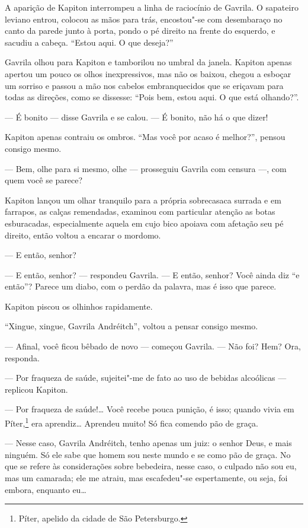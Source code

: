 A aparição de Kapiton interrompeu a linha de raciocínio de Gavrila. O
sapateiro leviano entrou, colocou as mãos para trás, encostou"-se com
desembaraço no canto da parede junto à porta, pondo o pé direito na
frente do esquerdo, e sacudiu a cabeça. ``Estou aqui. O que deseja?''

Gavrila olhou para Kapiton e tamborilou no umbral da janela. Kapiton
apenas apertou um pouco os olhos inexpressivos, mas não os baixou,
chegou a esboçar um sorriso e passou a mão nos cabelos embranquecidos
que se eriçavam para todas as direções, como se dissesse: ``Pois bem,
estou aqui. O que está olhando?''.

--- É bonito --- disse Gavrila e se calou. --- É bonito, não há o que
dizer!

Kapiton apenas contraiu os ombros. ``Mas você por acaso é melhor?'',
pensou consigo mesmo.

--- Bem, olhe para si mesmo, olhe --- prosseguiu Gavrila com censura
---, com quem você se parece?

Kapiton lançou um olhar tranquilo para a própria sobrecasaca surrada e
em farrapos, as calças remendadas, examinou com particular atenção as
botas esburacadas, especialmente aquela em cujo bico apoiava com
afetação seu pé direito, então voltou a encarar o mordomo.

--- E então, senhor?

--- E então, senhor? --- respondeu Gavrila. --- E então, senhor? Você
ainda diz ``e então''? Parece um diabo, com o perdão da palavra, mas é
isso que parece.

Kapiton piscou os olhinhos rapidamente.

``Xingue, xingue, Gavrila Andréitch'', voltou a pensar consigo mesmo.

--- Afinal, você ficou bêbado de novo --- começou Gavrila. --- Não foi?
Hem? Ora, responda.

--- Por fraqueza de saúde, sujeitei"-me de fato ao uso de bebidas
alcoólicas --- replicou Kapiton.

--- Por fraqueza de saúde!\ldots{} Você recebe pouca punição, é isso; quando
vivia em Píter,\footnote{Píter, apelido da cidade de São Petersburgo.}
era aprendiz\ldots{} Aprendeu muito! Só fica comendo pão de graça.

--- Nesse caso, Gavrila Andréitch, tenho apenas um juiz: o senhor Deus,
e mais ninguém. Só ele sabe que homem sou neste mundo e se como pão de
graça. No que se refere às considerações sobre bebedeira, nesse caso, o
culpado não sou eu, mas um camarada; ele me atraiu, mas escafedeu"-se
espertamente, ou seja, foi embora, enquanto eu\ldots{}

